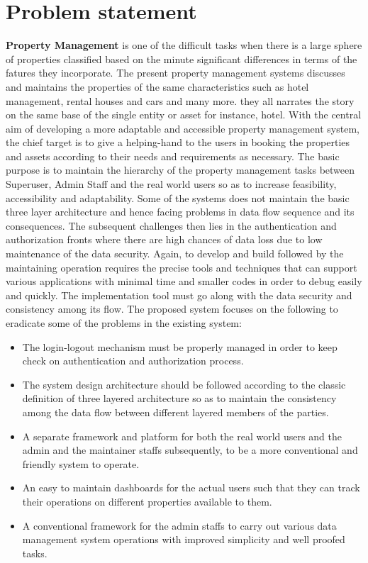 \documentclass[12pt]{report}
\begin{document}
\section {Problem statement}
\textbf{Property Management} is one of the difficult tasks when there is a large sphere of properties classified based on the minute significant differences in terms of the fatures they incorporate. The present property management systems discusses and maintains the properties of the same characteristics such as hotel management, rental houses and cars and many more. they all narrates the story on the same base of the single entity or asset for instance, hotel. With the central aim of developing a more adaptable and
accessible property management system, the chief target is to give a helping-hand to the
users in booking the properties and assets according to their needs and requirements as
necessary. The basic purpose is to maintain the hierarchy of the property
management tasks between Superuser, Admin Staff and the real world users so as to
increase feasibility, accessibility and adaptability.\newline
Some of the systems does not maintain the basic three layer architecture and hence facing problems in data flow sequence and its consequences. The subsequent challenges then lies in the authentication and authorization fronts where there are high chances of data loss due to low maintenance of the data security. Again, to develop and build followed by the maintaining operation requires the precise tools and techniques that can support various applications with minimal time and smaller codes in order to debug easily and quickly. The implementation tool must go along with the data security and consistency among its flow.   \newline
The proposed system focuses on the following to eradicate some of the problems in the existing system:
\begin{itemize}
\item The login-logout mechanism must be properly managed in order to keep check on authentication and authorization process.
\item The system design architecture should be followed according to the classic definition of three layered architecture so as to maintain the consistency among the data flow between different layered members of the parties.
\item A separate framework and platform for both the real world users and the admin and the maintainer staffs subsequently, to be a more conventional and friendly system to operate.
\item An easy to maintain dashboards for the actual users such that they can track their operations on different properties available to them.
\item A conventional framework for the admin staffs to carry out various data management system operations with improved simplicity and well proofed tasks.
\end{itemize}
 
\end{document}
